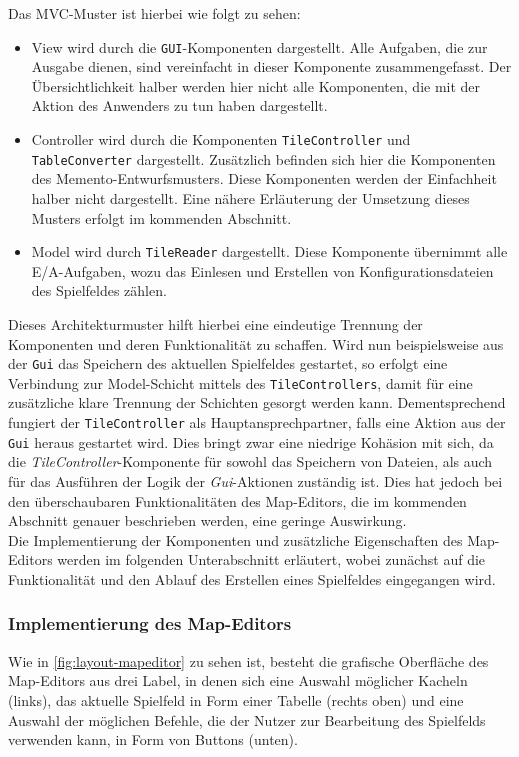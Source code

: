 Das MVC-Muster ist hierbei wie folgt zu sehen:
\begin{itemize}
\item View wird durch die \texttt{GUI}-Komponenten dargestellt. Alle Aufgaben, die zur Ausgabe dienen, sind vereinfacht in dieser Komponente zusammengefasst. Der Übersichtlichkeit halber werden hier nicht alle Komponenten, die mit der Aktion des Anwenders zu tun haben dargestellt.
\item Controller wird durch die Komponenten \texttt{TileController} und \texttt{TableConverter} dargestellt. Zusätzlich befinden sich hier die Komponenten des Memento-Entwurfsmusters. Diese Komponenten werden der Einfachheit halber nicht dargestellt. Eine nähere Erläuterung der Umsetzung dieses Musters erfolgt im kommenden Abschnitt.
\item Model wird durch \texttt{TileReader} dargestellt. Diese Komponente übernimmt alle E/A-Aufgaben, wozu das Einlesen und Erstellen von Konfigurationsdateien des Spielfeldes zählen.
\end{itemize}
Dieses Architekturmuster hilft hierbei eine eindeutige Trennung der Komponenten und deren Funktionalität zu schaffen. Wird nun beispielsweise aus der \texttt{Gui} das Speichern des aktuellen Spielfeldes gestartet, so erfolgt eine Verbindung zur Model-Schicht mittels des \texttt{TileControllers}, damit für eine zusätzliche klare Trennung der Schichten gesorgt werden kann. Dementsprechend fungiert der \texttt{TileController} als Hauptansprechpartner, falls eine Aktion aus der \texttt{Gui} heraus gestartet wird. Dies bringt zwar eine niedrige Kohäsion mit sich, da die \textit{TileController}-Komponente für sowohl das Speichern von Dateien, als auch für das Ausführen der Logik der \textit{Gui}-Aktionen zuständig ist. Dies hat jedoch bei den überschaubaren Funktionalitäten des Map-Editors, die im kommenden Abschnitt genauer beschrieben werden, eine geringe Auswirkung.\\
Die Implementierung der Komponenten und zusätzliche Eigenschaften des Map-Editors werden im folgenden Unterabschnitt erläutert, wobei zunächst auf die Funktionalität und den Ablauf des Erstellen eines Spielfeldes eingegangen wird.

\subsubsection{Implementierung des Map-Editors}
Wie in \autoref{fig:layout-mapeditor} zu sehen ist, besteht die grafische Oberfläche des Map-Editors aus drei Label, in denen sich eine Auswahl möglicher Kacheln (links), das aktuelle Spielfeld in Form einer Tabelle (rechts oben) und eine Auswahl der möglichen Befehle, die der Nutzer zur Bearbeitung des Spielfelds verwenden kann, in Form von Buttons (unten).

